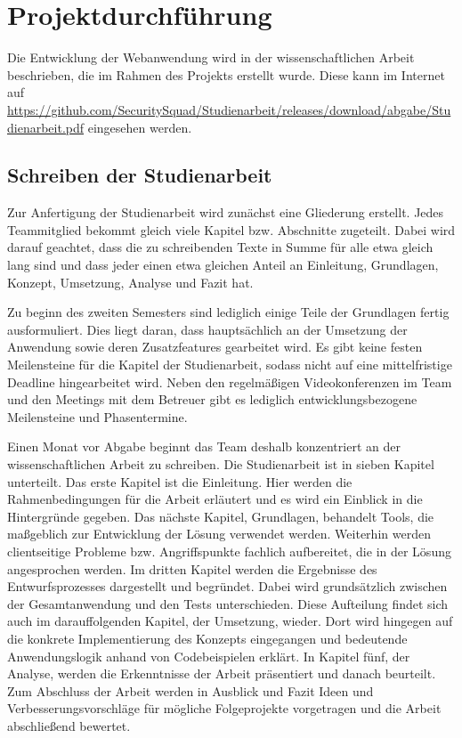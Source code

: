 \documentclass[
	pdftex,
	fontsize=12pt,          %
	DIV10,                  %
	ngerman,                %
	paper=a4,               %
	twoside=false,          %
	titlepage,              %
	parskip=half,           %
	headings=normal,        %
	listof=nochaptergap,  %
	bibliography=totoc, %
	index=totoc,            %
	captions=tableheading,  %
	final                 %
]{scrreprt}
\begin{document}
\newpage
\chapter{Projektdurchführung}

Die Entwicklung der Webanwendung wird in der wissenschaftlichen Arbeit beschrieben, die im Rahmen des Projekts erstellt wurde. Diese kann im Internet auf \url{https://github.com/SecuritySquad/Studienarbeit/releases/download/abgabe/Studienarbeit.pdf} eingesehen werden.


\section{Schreiben der Studienarbeit}

Zur Anfertigung der Studienarbeit wird zunächst eine Gliederung erstellt. Jedes Teammitglied bekommt gleich viele Kapitel bzw. Abschnitte zugeteilt. Dabei wird darauf geachtet, dass die zu schreibenden Texte in Summe für alle etwa gleich lang sind und dass jeder einen etwa gleichen Anteil an Einleitung, Grundlagen, Konzept, Umsetzung, Analyse und Fazit hat.

Zu beginn des zweiten Semesters sind lediglich einige Teile der Grundlagen fertig ausformuliert. Dies liegt daran, dass hauptsächlich an der Umsetzung der Anwendung sowie deren Zusatzfeatures gearbeitet wird. Es gibt keine festen Meilensteine für die Kapitel der Studienarbeit, sodass nicht auf eine mittelfristige Deadline hingearbeitet wird. Neben den regelmäßigen Videokonferenzen im Team und den Meetings mit dem Betreuer gibt es lediglich entwicklungsbezogene Meilensteine und Phasentermine.

Einen Monat vor Abgabe beginnt das Team deshalb konzentriert an der wissenschaftlichen Arbeit zu schreiben. Die Studienarbeit ist in sieben Kapitel unterteilt. Das erste Kapitel ist die Einleitung. Hier werden die Rahmenbedingungen für die Arbeit erläutert und es wird ein Einblick in die Hintergründe gegeben. Das nächste Kapitel, Grundlagen, behandelt Tools, die maßgeblich zur Entwicklung der Lösung verwendet werden. Weiterhin werden clientseitige Probleme bzw. Angriffspunkte fachlich aufbereitet, die in der Lösung angesprochen werden. Im dritten Kapitel werden die Ergebnisse des Entwurfsprozesses dargestellt und begründet. Dabei wird grundsätzlich zwischen der Gesamtanwendung und den Tests unterschieden. Diese Aufteilung findet sich auch im darauffolgenden Kapitel, der Umsetzung, wieder. Dort wird hingegen auf die konkrete Implementierung des Konzepts eingegangen und bedeutende Anwendungslogik anhand von Codebeispielen erklärt. In Kapitel fünf, der Analyse, werden die Erkenntnisse der Arbeit präsentiert und danach beurteilt. Zum Abschluss der Arbeit werden in Ausblick und Fazit Ideen und Verbesserungsvorschläge für mögliche Folgeprojekte vorgetragen und die Arbeit abschließend bewertet.
\end{document}
